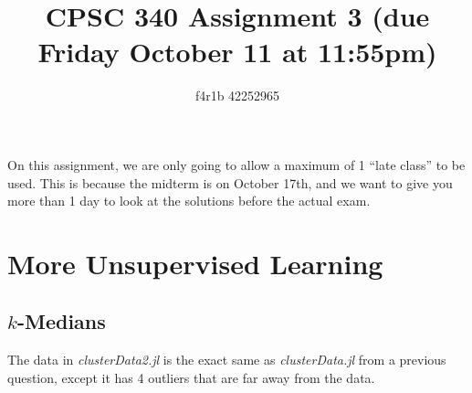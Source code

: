 \documentclass{article}
\def\blu#1{{\color{blu}#1}}
\begin{document}
\title{CPSC 340 Assignment 3 (due Friday October 11 at 11:55pm)}
\author{f4r1b 42252965}
\date{}
\maketitle
\vspace{-3em}

On this assignment, we are only going to allow a \blu{maximum of 1 ``late class''} to be used. This is because the midterm is on October 17th, and we want to give you more than 1 day to look at the solutions before the actual exam.

\section{More Unsupervised Learning}

 \subsection{$k$-Medians}
 
 The data in \emph{clusterData2.jl} is the exact same as \emph{clusterData.jl} from a previous question, except it has 4 outliers that are far away from the data.
 
\end{document}
